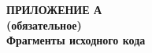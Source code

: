 \begin{center}
\textbf{
\MakeUppercase{Приложение А}\\
(обязательное)\\
Фрагменты исходного кода}
\end{center}


